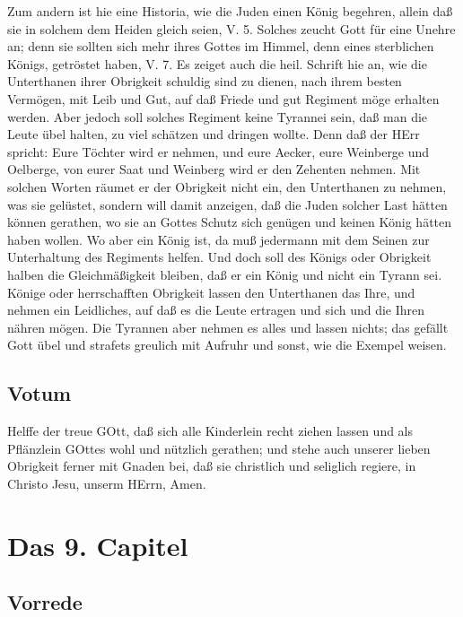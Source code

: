 Zum andern ist hie eine Historia, wie die Juden einen König begehren, allein daß sie in solchem dem Heiden gleich seien, V. 5. Solches zeucht Gott für eine Unehre an; denn sie sollten sich mehr ihres Gottes im Himmel, denn eines sterblichen Königs, getröstet haben, V. 7. Es zeiget auch die heil. Schrift hie an, wie die Unterthanen ihrer Obrigkeit schuldig sind zu dienen, nach ihrem besten Vermögen, mit Leib und Gut, auf daß Friede und gut Regiment möge erhalten werden. Aber jedoch soll solches Regiment keine Tyrannei sein, daß man die Leute übel halten, zu viel schätzen und dringen wollte. Denn daß der HErr spricht: Eure Töchter wird er nehmen, und eure Aecker, eure Weinberge und Oelberge, von eurer Saat und Weinberg wird er den Zehenten nehmen. Mit solchen Worten räumet er der Obrigkeit nicht ein, den Unterthanen zu nehmen, was sie gelüstet, sondern will damit anzeigen, daß die Juden solcher Last hätten können gerathen, wo sie an Gottes Schutz sich genügen und keinen König hätten haben wollen. Wo aber ein König ist, da muß jedermann mit dem Seinen zur Unterhaltung des Regiments helfen. Und doch soll des Königs oder Obrigkeit halben die Gleichmäßigkeit bleiben, daß er ein König und nicht ein Tyrann sei. Könige oder herrschafften Obrigkeit lassen den Unterthanen das Ihre, und nehmen ein Leidliches, auf daß es die Leute ertragen und sich und die Ihren nähren mögen. Die Tyrannen aber nehmen es alles und lassen nichts; das gefällt Gott übel und strafets greulich mit Aufruhr und sonst, wie die Exempel weisen.

\section{Votum}

Helffe der treue GOtt, daß sich alle Kinderlein recht ziehen lassen und als Pflänzlein GOttes wohl und nützlich gerathen; und stehe auch unserer lieben Obrigkeit ferner mit Gnaden bei, daß sie christlich und seliglich regiere, in Christo Jesu, unserm HErrn, Amen.

\chapter{Das 9. Capitel}

\section{Vorrede}

